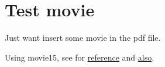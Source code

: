 \documentclass{article}
\begin{document}
\section{Test movie}
Just want insert some movie in the pdf file.

\begin{figure}[H]
\centering
\end{figure}

Using movie15, see for \href{http://pages.uoregon.edu/noeckel/PDFmovie.html}{reference} and \href{http://tex.stackexchange.com/questions/67663/did-anyone-succeed-in-playing-embedded-movies-inside-acrobat-in-linux}{also}.
\begin{figure}[ht]
\centering
\includemovie[
  poster,
  text={\small(Loading ABC.avi)}
]{6cm}{6cm}{ABC.avi}
\end{figure}
\end{document}
